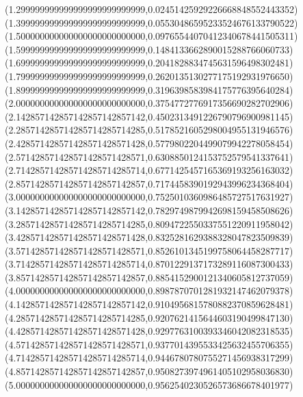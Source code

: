 \documentclass[11pt]{report}
\begin{document}
\begin{center}
  (1.299999999999999999999999999,0.02451425929226668848552443352)
  (1.399999999999999999999999999,0.05530486595233524676133790522)
  (1.500000000000000000000000000,0.09765544070412340678441505311)
  (1.599999999999999999999999999,0.1484133662890015288766060733)
  (1.699999999999999999999999999,0.2041828834745631596498302481)
  (1.799999999999999999999999999,0.2620135130277175192931976650)
  (1.899999999999999999999999999,0.3196398583984175776395640284)
  (2.000000000000000000000000000,0.3754772776917356690282702906)
  (2.142857142857142857142857142,0.4502313491226790796900981145)
  (2.285714285714285714285714285,0.5178521605298004955131946576)
  (2.428571428571428571428571428,0.5779802204499079942278058454)
  (2.571428571428571428571428571,0.6308850124153752579541337641)
  (2.714285714285714285714285714,0.6771425457165369193256163032)
  (2.857142857142857142857142857,0.7174458390192943996234368404)
  (3.000000000000000000000000000,0.7525010360986485727517631927)
  (3.142857142857142857142857142,0.7829749879942698159458508626)
  (3.285714285714285714285714285,0.8094722550337551220911958042)
  (3.428571428571428571428571428,0.8325281629388328047823509839)
  (3.571428571428571428571428571,0.8526101345199758064458287717)
  (3.714285714285714285714285714,0.8701229137173289116087300433)
  (3.857142857142857142857142857,0.8854152900121340605812737059)
  (4.000000000000000000000000000,0.8987870701281932147462079378)
  (4.142857142857142857142857142,0.9104956815780882370859628481)
  (4.285714285714285714285714285,0.9207621415644603190499847130)
  (4.428571428571428571428571428,0.9297763100393346042082318535)
  (4.571428571428571428571428571,0.9377014395533425632455706355)
  (4.714285714285714285714285714,0.9446780780755271456938317299)
  (4.857142857142857142857142857,0.9508273974961405102958036830)
  (5.000000000000000000000000000,0.9562540230526573686678401977)



\end{center}
\end{document}
